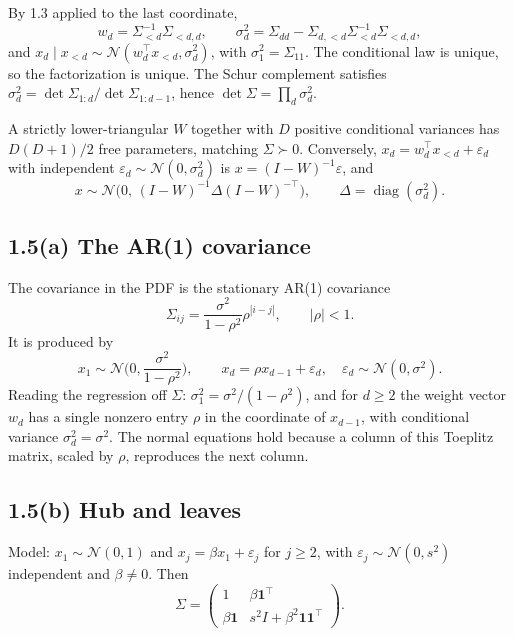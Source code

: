 \documentclass[11pt]{article}
\theoremstyle{remark}
\newcommand{\N}{\mathcal{N}}
\begin{document}
By 1.3 applied to the last coordinate,
\[
w_d=\Sigma_{<d}^{-1}\Sigma_{<d,d},\qquad
\sigma_d^2=\Sigma_{dd}-\Sigma_{d,<d}\Sigma_{<d}^{-1}\Sigma_{<d,d},
\]
and \(x_d\mid x_{<d}\sim\N(w_d^\top x_{<d},\sigma_d^2)\), with \(\sigma_1^2=\Sigma_{11}\). The conditional law is unique, so the factorization is unique. The Schur complement satisfies \(\sigma_d^2=\det\Sigma_{1:d}/\det\Sigma_{1:d-1}\), hence \(\det\Sigma=\prod_d\sigma_d^2\).

A strictly lower-triangular \(W\) together with \(D\) positive conditional variances has \(D(D+1)/2\) free parameters, matching \(\Sigma\succ 0\). Conversely, \(x_d=w_d^\top x_{<d}+\varepsilon_d\) with independent \(\varepsilon_d\sim\N(0,\sigma_d^2)\) is \(x=(I-W)^{-1}\varepsilon\), and
\[
x\sim\N\big(0,\,(I-W)^{-1}\Delta(I-W)^{-\top}\big),
\qquad\Delta=\operatorname{diag}(\sigma_d^2).
\]

\subsection*{1.5(a) The AR(1) covariance}

The covariance in the PDF is the stationary AR(1) covariance
\[
\Sigma_{ij}=\frac{\sigma^2}{1-\rho^2}\rho^{|i-j|},\qquad|\rho|<1.
\]
It is produced by
\[
x_1\sim\N\Big(0,\frac{\sigma^2}{1-\rho^2}\Big),\qquad
x_d=\rho x_{d-1}+\varepsilon_d,\quad\varepsilon_d\sim\N(0,\sigma^2).
\]
Reading the regression off \(\Sigma\): \(\sigma_1^2=\sigma^2/(1-\rho^2)\), and for \(d\ge 2\) the weight vector \(w_d\) has a single nonzero entry \(\rho\) in the coordinate of \(x_{d-1}\), with conditional variance \(\sigma_d^2=\sigma^2\). The normal equations hold because a column of this Toeplitz matrix, scaled by \(\rho\), reproduces the next column.

\subsection*{1.5(b) Hub and leaves}

Model: \(x_1\sim\N(0,1)\) and \(x_j=\beta x_1+\varepsilon_j\) for \(j\ge 2\), with \(\varepsilon_j\sim\N(0,s^2)\) independent and \(\beta\ne 0\). Then
\[
\Sigma
=\begin{pmatrix}
1 & \beta\mathbf{1}^\top\\
\beta\mathbf{1} & s^2 I+\beta^2\mathbf{1}\mathbf{1}^\top
\end{pmatrix}.
\]
\end{document}
